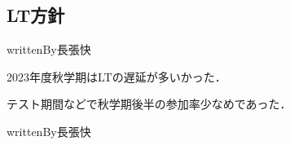 \subsection*{LT方針}

writtenBy{\kensuiChief}{長張}{快}


2023年度秋学期はLTの遅延が多いかった．

テスト期間などで秋学期後半の参加率少なめであった．

writtenBy{\kensuiStaff}{長張}{快}
